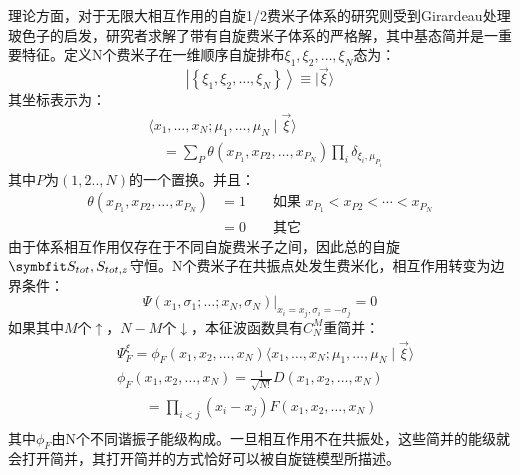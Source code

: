 理论方面，对于无限大相互作用的自旋1/2费米子体系的研究则受到Girardeau处理玻色子的启发，研究者求解了带有自旋费米子体系的严格解\cite{Guan2009exact}，其中基态简并是一重要特征。定义N个费米子在一维顺序自旋排布$\xi_{1}, \xi_{2}, \ldots, \xi_{N}$态为：
\begin{equation}
\left|\left\{\xi_{1}, \xi_{2}, \ldots, \xi_{N}\right\}\right\rangle \equiv|\vec{\xi}\rangle
\end{equation}
其坐标表示为：
\begin{equation}
\begin{aligned}
&\langle x_{1}, \ldots, x_{N} ; \mu_{1}, \ldots, \mu_{N} \mid \vec{\xi}\rangle \\
&\quad=\sum_{P} \theta\left(x_{P_{1}}, x_{P 2}, \ldots, x_{P_{N}}\right) \prod_{i} \delta_{\xi_{i}, \mu_{P_{i}}}
\end{aligned}
\end{equation}
其中$P$为$(1,2..,N)$的一个置换。并且：
\begin{equation}
\begin{aligned}
\theta\left(x_{P_{1}}, x_{P 2}, \ldots, x_{P_{N}}\right) &=1 & & \text { 如果 } x_{P_{1}}<x_{P 2}<\cdots<x_{P_{N}} \\
&=0 & & \text { 其它 }
\end{aligned}
\end{equation}
由于体系相互作用仅存在于不同自旋费米子之间，因此总的自旋$\Vector{S}_{tot},S_{tot,z}$守恒。N个费米子在共振点处发生费米化，相互作用转变为边界条件：
\begin{equation}
\left.\Psi\left(x_{1}, \sigma_{1} ; \ldots ; x_{N}, \sigma_{N}\right)\right|_{x_{i}=x_{j}, \sigma_{i}=-\sigma_{j}}=0
\end{equation}
如果其中$M$个$\uparrow$，$N-M$个$\downarrow$，本征波函数具有$C_N^M$重简并：
\begin{equation}
\begin{split}
&\Psi_{F}^{\xi}=\phi_{F}\left(x_{1}, x_{2}, \ldots, x_{N}\right)\langle x_{1}, \ldots, x_{N} ; \mu_{1}, \ldots, \mu_{N} \mid \vec{\xi}\rangle\\
&\phi_{F}\left(x_{1}, x_{2}, \ldots, x_{N}\right) =\frac{1}{\sqrt{N !}} D\left(x_{1}, x_{2}, \ldots, x_{N}\right) \\
&\quad\quad =\prod_{i<j}\left(x_{i}-x_{j}\right) F\left(x_{1}, x_{2}, \ldots, x_{N}\right)\\
\end{split}
\end{equation}
其中$\phi_F$由N个不同谐振子能级构成。一旦相互作用不在共振处，这些简并的能级就会打开简并，其打开简并的方式恰好可以被自旋链模型所描述。
